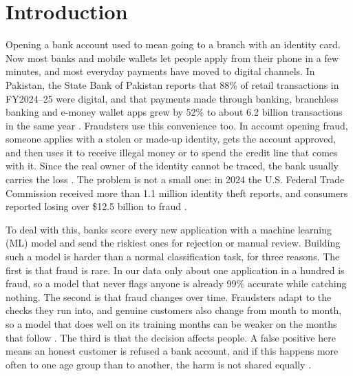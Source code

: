 \section{Introduction}
\label{sec:intro}

Opening a bank account used to mean going to a branch with an identity card. Now most banks and
mobile wallets let people apply from their phone in a few minutes, and most everyday payments have
moved to digital channels. In Pakistan, the State Bank of Pakistan reports that 88\% of retail
transactions in FY2024--25 were digital, and that payments made through banking, branchless banking
and e-money wallet apps grew by 52\% to about 6.2 billion transactions in the same year
\cite{sbp2025payment}. Fraudsters use this convenience too. In account opening fraud, someone
applies with a stolen or made-up identity, gets the account approved, and then uses it to receive
illegal money or to spend the credit line that comes with it. Since the real owner of the identity
cannot be traced, the bank usually carries the loss \cite{jesus2022turning}. The problem is not a
small one: in 2024 the U.S. Federal Trade Commission received more than 1.1 million identity theft
reports, and consumers reported losing over \$12.5 billion to fraud \cite{ftc2025sentinel}.

To deal with this, banks score every new application with a machine learning (ML) model and send
the riskiest ones for rejection or manual review. Building such a model is harder than a normal
classification task, for three reasons. The first is that fraud is rare. In our data only about one
application in a hundred is fraud, so a model that never flags anyone is already 99\% accurate while
catching nothing. The second is that fraud changes over time. Fraudsters adapt to the checks they
run into, and genuine customers also change from month to month, so a model that does well on its
training months can be weaker on the months that follow \cite{dalpozzolo2018credit}. The third is
that the decision affects people. A false positive here means an honest customer is refused a bank
account, and if this happens more often to one age group than to another, the harm is not shared
equally \cite{jesus2022turning}.

